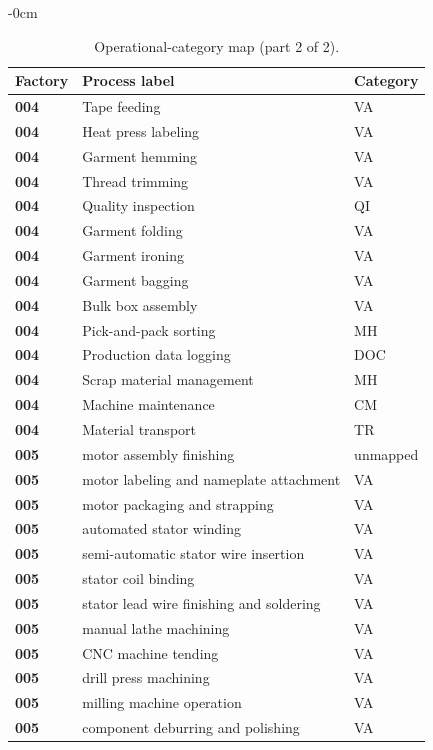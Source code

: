 \begin{table}[!t]\begin{adjustwidth}{-\extralength}{0cm}
\caption{Operational-category map (part 2 of 2).}\label{tab:mapping_2}
\small\renewcommand{\arraystretch}{0.96}\begin{tabularx}{\linewidth}{@{}l L l@{}}
\toprule Factory & Process label & Category \\ \midrule
\textbf{004} & Tape feeding & VA \\
\textbf{004} & Heat press labeling & VA \\
\textbf{004} & Garment hemming & VA \\
\textbf{004} & Thread trimming & VA \\
\textbf{004} & Quality inspection & QI \\
\textbf{004} & Garment folding & VA \\
\textbf{004} & Garment ironing & VA \\
\textbf{004} & Garment bagging & VA \\
\textbf{004} & Bulk box assembly & VA \\
\textbf{004} & Pick-and-pack sorting & MH \\
\textbf{004} & Production data logging & DOC \\
\textbf{004} & Scrap material management & MH \\
\textbf{004} & Machine maintenance & CM \\
\textbf{004} & Material transport & TR \\
\textbf{005} & motor assembly finishing & unmapped \\
\textbf{005} & motor labeling and nameplate attachment & VA \\
\textbf{005} & motor packaging and strapping & VA \\
\textbf{005} & automated stator winding & VA \\
\textbf{005} & semi-automatic stator wire insertion & VA \\
\textbf{005} & stator coil binding & VA \\
\textbf{005} & stator lead wire finishing and soldering & VA \\
\textbf{005} & manual lathe machining & VA \\
\textbf{005} & CNC machine tending & VA \\
\textbf{005} & drill press machining & VA \\
\textbf{005} & milling machine operation & VA \\
\textbf{005} & component deburring and polishing & VA \\

\end{tabularx}
\end{adjustwidth}
\end{table}
